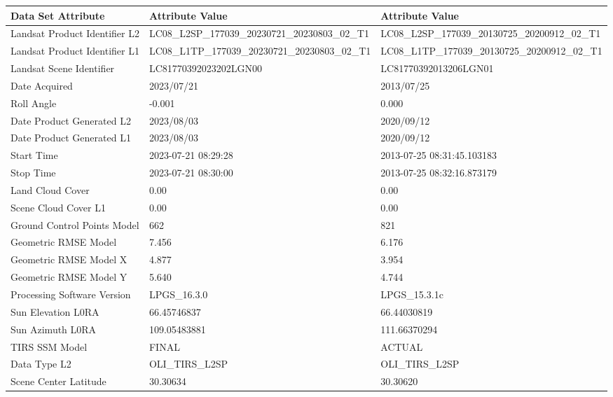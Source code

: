 \documentclass[final,5p,times,twocolumn]{elsarticle}
\begin{document}
\begin{table}[t]
    \centering
    \small{
     \begin{tabular}{|l|l|l|}
    \hline
        	\textbf{Data Set Attribute} & \textbf{Attribute Value} & \textbf{Attribute Value} \\ \hline
        Landsat Product Identifier L2 & LC08\_L2SP\_177039\_20230721\_20230803\_02\_T1 & LC08\_L2SP\_177039\_20130725\_20200912\_02\_T1 \\ \hline
        Landsat Product Identifier L1 & LC08\_L1TP\_177039\_20230721\_20230803\_02\_T1 & LC08\_L1TP\_177039\_20130725\_20200912\_02\_T1 \\ \hline
        Landsat Scene Identifier & LC81770392023202LGN00 & LC81770392013206LGN01 \\ \hline
        Date Acquired & 2023/07/21 & 2013/07/25 \\ \hline
        Roll Angle & -0.001 & 0.000 \\ \hline
        Date Product Generated L2 & 2023/08/03 & 2020/09/12 \\ \hline
        Date Product Generated L1 & 2023/08/03 & 2020/09/12 \\ \hline
        Start Time & 2023-07-21 08:29:28 & 2013-07-25 08:31:45.103183 \\ \hline
        Stop Time & 2023-07-21 08:30:00 & 2013-07-25 08:32:16.873179 \\ \hline
        Land Cloud Cover & 0.00 & 0.00 \\ \hline
        Scene Cloud Cover L1 & 0.00 & 0.00 \\ \hline
        Ground Control Points Model & 662 & 821 \\ \hline
        Geometric RMSE Model & 7.456 & 6.176 \\ \hline
        Geometric RMSE Model X & 4.877 & 3.954 \\ \hline
        Geometric RMSE Model Y & 5.640 & 4.744 \\ \hline
        Processing Software Version & LPGS\_16.3.0 & LPGS\_15.3.1c \\ \hline
        Sun Elevation L0RA & 66.45746837 & 66.44030819 \\ \hline
        Sun Azimuth L0RA & 109.05483881 & 111.66370294 \\ \hline
        TIRS SSM Model & FINAL & ACTUAL \\ \hline
        Data Type L2 & OLI\_TIRS\_L2SP & OLI\_TIRS\_L2SP \\ \hline
        Scene Center Latitude & 30.30634 & 30.30620 \\ \hline

\end{tabular}}
\end{table}
\end{document}
